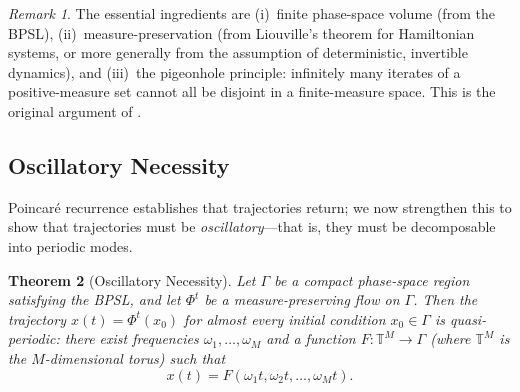 \documentclass[11pt,twocolumn,a4paper]{article}
\newtheorem{theorem}{Theorem}[section]
\theoremstyle{definition}
\theoremstyle{remark}
\newtheorem{remark}[theorem]{Remark}
\begin{document}
\begin{remark}
The essential ingredients are (i)~finite phase-space volume (from the BPSL), (ii)~measure-preservation (from Liouville's theorem for Hamiltonian systems, or more generally from the assumption of deterministic, invertible dynamics), and (iii)~the pigeonhole principle: infinitely many iterates of a positive-measure set cannot all be disjoint in a finite-measure space. This is the original argument of \citet{poincare1890}.
\end{remark}

\subsection{Oscillatory Necessity}\label{sec:oscillatory}

Poincar\'{e} recurrence establishes that trajectories return; we now strengthen this to show that trajectories must be \emph{oscillatory}---that is, they must be decomposable into periodic modes.

\begin{theorem}[Oscillatory Necessity]\label{thm:oscillatory}
Let $\Gamma$ be a compact phase-space region satisfying the BPSL, and let $\Phi^t$ be a measure-preserving flow on $\Gamma$. Then the trajectory $x(t) = \Phi^t(x_0)$ for almost every initial condition $x_0 \in \Gamma$ is quasi-periodic: there exist frequencies $\omega_1, \ldots, \omega_M$ and a function $F\colon \mathbb{T}^M \to \Gamma$ (where $\mathbb{T}^M$ is the $M$-dimensional torus) such that
\begin{equation}\label{eq:quasiperiodic}
  x(t) = F(\omega_1 t, \omega_2 t, \ldots, \omega_M t).
\end{equation}
\end{theorem}
\end{document}
